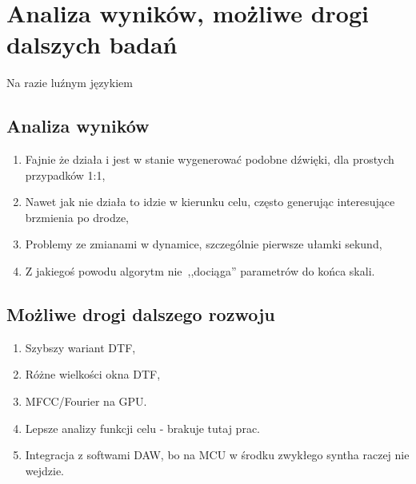 \chapter{Analiza wyników, możliwe drogi dalszych badań}\label{chap:results_analysis}

\begin{center}
  \large Na razie luźnym językiem
\end{center}

\section{Analiza wyników}

\begin{enumerate}
  \item Fajnie że działa i jest w stanie wygenerować podobne dźwięki, dla prostych przypadków 1:1,
  \item Nawet jak nie działa to idzie w kierunku celu, często generując interesujące brzmienia po drodze,
  \item Problemy ze zmianami w dynamice, szczególnie pierwsze ułamki sekund,
  \item Z jakiegoś powodu algorytm nie~,,dociąga'' parametrów do końca skali.
\end{enumerate}

\section{Możliwe drogi dalszego rozwoju}

\begin{enumerate}
  \item Szybszy wariant DTF,
  \item Różne wielkości okna DTF,
  \item MFCC/Fourier na GPU\@.
  \item Lepsze analizy funkcji celu - brakuje tutaj prac.
  \item Integracja z softwami DAW\@, bo na MCU w środku zwykłego syntha raczej nie wejdzie.
\end{enumerate}

